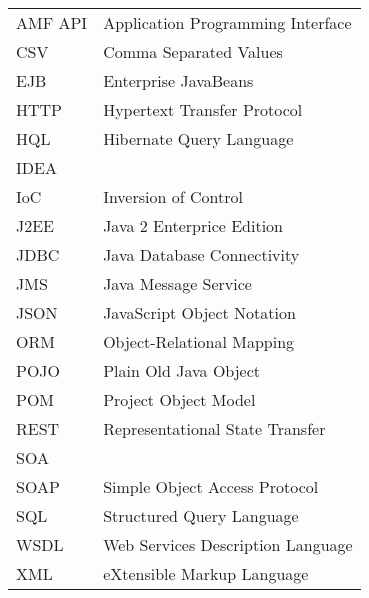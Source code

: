 
\seznamzkr

\begin{tabular}{ll}
  AMF
  API	& Application Programming Interface	\\
  CSV	& Comma Separated Values			\\
  EJB	& Enterprise JavaBeans				\\
  HTTP	& Hypertext Transfer Protocol		\\
  HQL	& Hibernate Query Language			\\
  IDEA	& 									\\
  IoC	& Inversion of Control				\\
  J2EE	& Java 2 Enterprice Edition			\\
  JDBC	& Java Database Connectivity		\\
  JMS	& Java Message Service				\\
  JSON	& JavaScript Object Notation		\\
  ORM	& Object-Relational Mapping			\\
  POJO	& Plain Old Java Object				\\
  POM	& Project Object Model				\\
  REST	& Representational State Transfer	\\
  SOA	& 									\\
  SOAP	& Simple Object Access Protocol 	\\
  SQL	& Structured Query Language		 	\\
  WSDL	& Web Services Description Language	\\
  XML	& eXtensible Markup Language		\\
\end{tabular}

